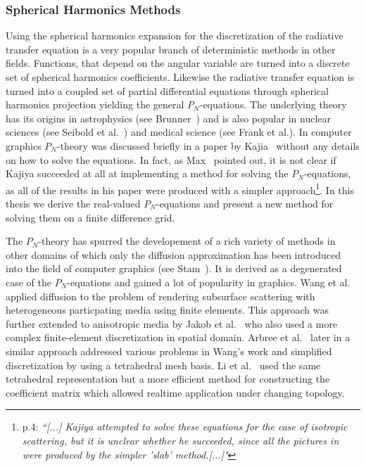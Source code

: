 \subsubsection*{Spherical Harmonics Methods}
Using the spherical harmonics expansion for the discretization of the radiative transfer equation is a very popular branch of deterministic methods in other fields. Functions, that depend on the angular variable are turned into a discrete set of spherical harmonics coefficients. Likewise the radiative transfer equation is turned into a coupled set of partial differential equations through spherical harmonics projection yielding the general $P_N$-equations. The underlying theory has its origins in astrophysics (see Brunner~\cite{Brunner02}) and is also popular in nuclear sciences (see Seibold et al.~\cite{Seibold14}) and medical science (see Frank et al.\cite{Frank08}). In computer graphics $P_N$-theory was discussed briefly in a paper by Kajia~\cite{Kajiya84} without any details on how to solve the equations. In fact, as Max~\cite{Max95} pointed out, it is not clear if Kajiya succeeded at all at implementing a method for solving the $P_N$-equations, as all of the results in his paper were produced with a simpler approach\footnote{\cite{Max95} p.4: \emph{``[...] Kajiya attempted to solve these equations for the case of isotropic scattering, but it is unclear whether he succeeded, since all the pictures in \cite{Kajiya84} were produced by the simpler 'slab' method.[...]"}}. In this thesis we derive the real-valued $P_N$-equations and present a new method for solving them on a finite difference grid. 

The $P_N$-theory has spurred the developement of a rich variety of methods in other domains of which only the diffusion approximation has been introduced into the field of computer graphics (see Stam~\cite{Stam95}). It is derived as a degenerated case of the $P_N$-equations and gained a lot of popularity in graphics. Wang et al.~\cite{Wang08} applied diffusion to the problem of rendering subsurface scattering with heterogeneous particpating media using finite elements. This approach was further extended to anisotropic media by Jakob et al.~\cite{Jakob10} who also used a more complex finite-element discretization in spatial domain. Arbree et al.~\cite{Arbree11} later in a similar approach addressed various problems in Wang's work and simplified discretization by using a tetrahedral mesh basis. Li et al.~\cite{Li13} used the same tetrahedral representation but a more efficient method for constructing the coefficient matrix which allowed realtime application under changing topology.


